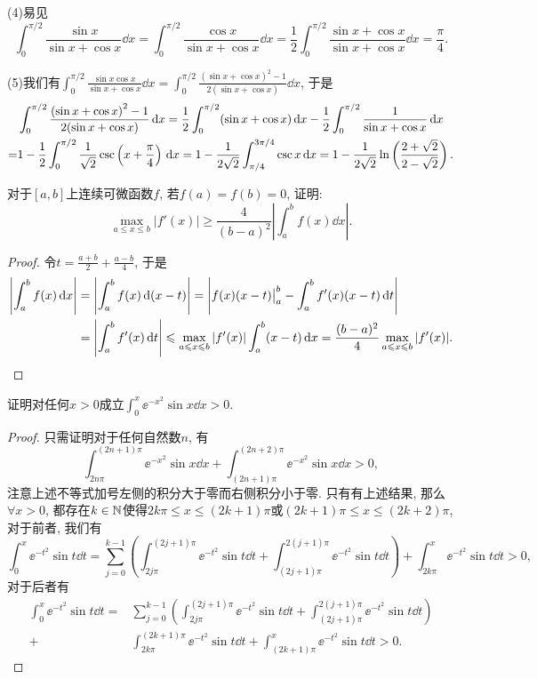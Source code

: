 \begin{quiza}
\begin{solution}
(4)易见\[\int_{0}^{\pi/2}\frac{\sin x}{\sin x+\cos x}\dd x=\int_{0}^{\pi/2}\frac{\cos x}{\sin x+\cos x}\dd x=\frac{1}{2}\int_{0}^{\pi/2}\frac{\sin x+\cos x}{\sin x+\cos x}\dd x=\frac{\pi}{4}.\]

(5)我们有\(\int_{0}^{\pi/2}\frac{\sin x\cos x}{\sin x+\cos x}\dd x=\int_{0}^{\pi/2}\frac{\left(\sin x+\cos x\right)^2-1}{2(\sin x+\cos x)}\dd x\), 于是\[\begin{split}
&\int_{0}^{\pi/2}\frac{\left(\sin x+\cos x\right)^2-1}{2(\sin x+\cos x)}\,\mathrm{d} x=\frac{1}{2}\int_{0}^{\pi/2}(\sin x+\cos x)\,\mathrm{d} x-\frac{1}{2}\int_{0}^{\pi/2}\frac{1}{\sin x+\cos x}\,\mathrm{d} x\\
=&1-\frac{1}{2}\int_{0}^{\pi/2}\frac{1}{\sqrt{2}}\csc \left(x+\frac{\pi}{4}\right)\,\mathrm{d} x=1-\frac{1}{2\sqrt{2}}\int_{\pi/4}^{3\pi/4}\csc x\,\mathrm{d} x=1-\frac{1}{2\sqrt{2}}\ln\left(\frac{2+\sqrt{2}}{2-\sqrt{2}}\right).\qedhere
\end{split}\]
\end{solution}
\woe 对于\([a,b]\)上连续可微函数\(f\), 若\(f(a)=f(b)=0\), 证明:\[\max_{a\leqslant x\leqslant b}|f'(x)|\geqslant\frac{4}{(b-a)^2}\left|\int_{a}^{b}f(x)\dd x\right|.\]
\begin{proof}
令\(t=\frac{a+b}{2}+\frac{a-b}{4}\), 于是\[\begin{split}
\left|\int_{a}^{b}f(x)\,\mathrm{d} x\right|&=\left|\int_{a}^{b}f(x)\,\mathrm{d} (x-t)\right|=\left|f(x)(x-t)\big|^b_a-\int_{a}^{b}f'(x)(x-t)\,\mathrm{d} t\right|\\&=\left|\int_{a}^{b}f'(x)\,\mathrm{d} t\right|\leqslant \max_{a\leqslant x\leqslant b}|f'(x)|\int_{a}^{b}(x-t)\,\mathrm{d} x=\frac{(b-a)^2}{4}\max_{a\leqslant x\leqslant b}|f'(x)|.\qedhere
\end{split}\]
\end{proof}
\woe 证明对任何\(x>0\)成立\(\int_{0}^{x}\ee^{-x^2}\sin x\dd x>0.\)
\begin{proof}
只需证明对于任何自然数\(n\), 有\[\int_{2n\pi}^{(2n+1)\pi}\ee^{-x^2}\sin x\dd x+\int_{(2n+1)\pi}^{(2n+2)\pi}\ee^{-x^2}\sin x\dd x>0,\]注意上述不等式加号左侧的积分大于零而右侧积分小于零. 只有有上述结果, 那么\(\forall x> 0\), 都存在\(k\in\mathbb{N}\)使得\(2k\pi\leqslant x\leqslant (2k+1)\pi\)或\((2k+1)\pi\leqslant x\leqslant (2k+2)\pi\), 对于前者, 我们有\[\int_{0}^{x}\ee^{-t^2}\sin t\dd t=\sum_{j=0}^{k-1}\left(\int_{2j\pi}^{\left(2j+1\right)\pi}\ee^{-t^2}\sin t\dd t+\int_{\left(2j+1\right)\pi}^{2\left(j+1\right)\pi}\ee^{-t^2}\sin t\dd t\right)+\int_{2k\pi}^{x}\ee^{-t^2}\sin t\dd t>0,\]对于后者有\[\begin{split}
\int_{0}^{x}\ee^{-t^2}\sin t\dd t=&\sum_{j=0}^{k-1}\left(\int_{2j\pi}^{\left(2j+1\right)\pi}\ee^{-t^2}\sin t\dd t+\int_{\left(2j+1\right)\pi}^{2\left(j+1\right)\pi}\ee^{-t^2}\sin t\dd t\right)\\+&\int_{2k\pi}^{(2k+1)\pi}\ee^{-t^2}\sin t\dd t+\int_{(2k+1)\pi}^{x}\ee^{-t^2}\sin t\dd t>0.
\end{split}\]


\end{proof}
\end{quiza}
